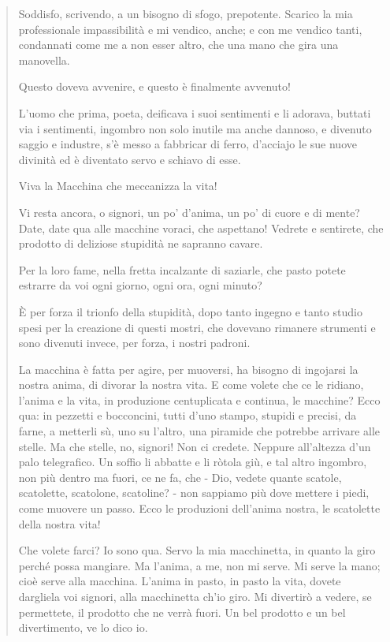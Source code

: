 \documentclass[a4paper, twoside, titlepage]{book}
\begin{document}
\begin{quotation}
Soddisfo, scrivendo, a un bisogno di sfogo, prepotente. Scarico la mia professionale impassibilità e mi vendico, anche; e con me vendico tanti, condannati come me a non esser altro, che una mano che gira una manovella.

Questo doveva avvenire, e questo è finalmente avvenuto!

L'uomo che prima, poeta, deificava i suoi sentimenti e li adorava, buttati via i sentimenti, ingombro non solo inutile ma anche dannoso, e divenuto saggio e industre, s'è messo a fabbricar di ferro, d'acciajo le sue nuove divinità ed è diventato servo e schiavo di esse.

Viva la Macchina che meccanizza la vita!

Vi resta ancora, o signori, un po' d'anima, un po' di cuore e di mente? Date, date qua alle macchine voraci, che aspettano! Vedrete e sentirete, che prodotto di deliziose stupidità ne sapranno cavare.

Per la loro fame, nella fretta incalzante di saziarle, che pasto potete estrarre da voi ogni giorno, ogni ora, ogni minuto?

È per forza il trionfo della stupidità, dopo tanto ingegno e tanto studio spesi per la creazione di questi mostri, che dovevano rimanere strumenti e sono divenuti invece, per forza, i nostri padroni.

La macchina è fatta per agire, per muoversi, ha bisogno di ingojarsi la nostra anima, di divorar la nostra vita. E come volete che ce le ridiano, l'anima e la vita, in produzione centuplicata e continua, le macchine? Ecco qua: in pezzetti e bocconcini, tutti d'uno stampo, stupidi e precisi, da farne, a metterli sù, uno su l'altro, una piramide che potrebbe arrivare alle stelle. Ma che stelle, no, signori! Non ci credete. Neppure all'altezza d'un palo telegrafico. Un soffio li abbatte e li ròtola giù, e tal altro ingombro, non più dentro ma fuori, ce ne fa, che - Dio, vedete quante scatole, scatolette, scatolone, scatoline? - non sappiamo più dove mettere i piedi, come muovere un passo. Ecco le produzioni dell'anima nostra, le scatolette della nostra vita!

Che volete farci? Io sono qua. Servo la mia macchinetta, in quanto la giro perché possa mangiare. Ma l'anima, a me, non mi serve. Mi serve la mano; cioè serve alla macchina. L'anima in pasto, in pasto la vita, dovete dargliela voi signori, alla macchinetta ch'io giro. Mi divertirò a vedere, se permettete, il prodotto che ne verrà fuori. Un bel prodotto e un bel divertimento, ve lo dico io.


\end{quotation}
\end{document}
